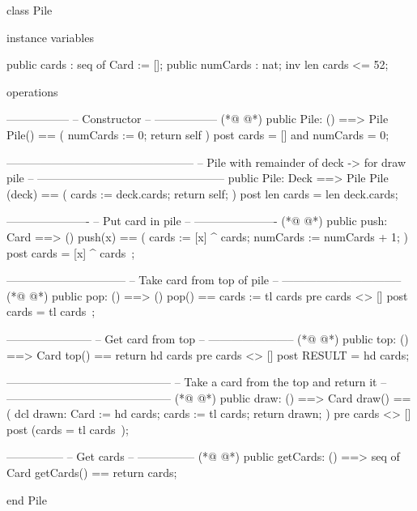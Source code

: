 \begin{vdmpp}[breaklines=true]
class Pile


 instance variables
 
  public cards : seq of Card := [];
  public numCards : nat;
  inv len cards <= 52;
 
  
 operations
 
  -----------------
  -- Constructor --
  -----------------
(*@
\label{Pile:16}
@*)
  public Pile: () ==> Pile
  Pile() == 
  (
   numCards := 0;
   return self
  )
  post cards = [] and numCards = 0;
  
  --------------------------------------------------
  -- Pile with remainder of deck -> for draw pile --
  --------------------------------------------------
  public Pile: Deck ==> Pile
  Pile (deck) == 
  (
   cards := deck.cards;
   return self;
  )
  post len cards = len deck.cards;
  
  ----------------------
  -- Put card in pile --
  ----------------------
(*@
\label{push:38}
@*)
  public push: Card ==> ()
   push(x) == 
   (
    cards := [x] ^ cards;
    numCards := numCards + 1;
   )
  post cards = [x] ^ cards~;
  
  --------------------------------
  -- Take card from top of pile --
  --------------------------------
(*@
\label{pop:49}
@*)
  public pop: () ==> ()
   pop() == cards := tl cards
  pre cards <> []
  post cards = tl cards~;
  
  -----------------------
  -- Get card from top --
  -----------------------
(*@
\label{top:57}
@*)
  public top: () ==> Card
   top() == return hd cards
  pre cards <> []
  post RESULT = hd cards;
  
  --------------------------------------------
  -- Take a card from the top and return it --
  --------------------------------------------
(*@
\label{draw:65}
@*)
  public draw: () ==> Card
   draw() == 
   (
    dcl drawn: Card := hd cards;
    cards := tl cards;
    return drawn;
   )
  pre cards <> []
  post (cards = tl cards~);
  
  ---------------
  -- Get cards --
  ---------------
(*@
\label{getCards:78}
@*)
  public getCards: () ==> seq of Card
  getCards() == return cards;
  

  
end Pile
\end{vdmpp}

